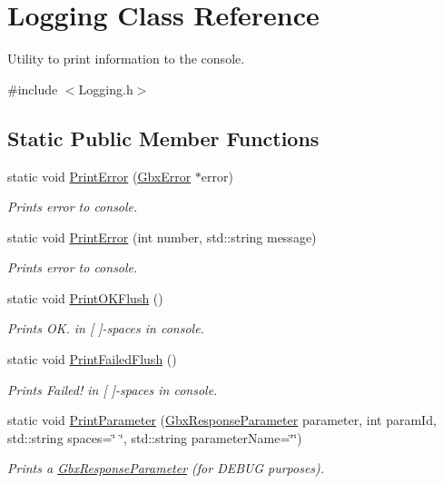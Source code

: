 \hypertarget{classLogging}{\section{Logging Class Reference}
\label{classLogging}
}


Utility to print information to the console.  




{\ttfamily \#include $<$Logging.\-h$>$}

\subsection*{Static Public Member Functions}
\begin{DoxyCompactItemize}
\item 
static void \hyperlink{classLogging_a171703bedcbf215f0e6334f29c8281b5}{Print\-Error} (\hyperlink{structGbxError}{Gbx\-Error} $\ast$error)
\begin{DoxyCompactList}\small\item\em Prints error to console. \end{DoxyCompactList}\item 
static void \hyperlink{classLogging_ac1397db1b8ea6625f7dd2616f530cd7d}{Print\-Error} (int number, std\-::string message)
\begin{DoxyCompactList}\small\item\em Prints error to console. \end{DoxyCompactList}\item 
\hypertarget{classLogging_a889f2ad8f991afdf0959cb1cad736fa7}{static void \hyperlink{classLogging_a889f2ad8f991afdf0959cb1cad736fa7}{Print\-O\-K\-Flush} ()}\label{classLogging_a889f2ad8f991afdf0959cb1cad736fa7}

\begin{DoxyCompactList}\small\item\em Prints O\-K. in \mbox{[} \mbox{]}-\/spaces in console. \end{DoxyCompactList}\item 
\hypertarget{classLogging_add0483bd14aef74ec988606cd7dbfc4b}{static void \hyperlink{classLogging_add0483bd14aef74ec988606cd7dbfc4b}{Print\-Failed\-Flush} ()}\label{classLogging_add0483bd14aef74ec988606cd7dbfc4b}

\begin{DoxyCompactList}\small\item\em Prints Failed! in \mbox{[} \mbox{]}-\/spaces in console. \end{DoxyCompactList}\item 
static void \hyperlink{classLogging_a1f8609052e40055fb9ef3ddd40d0620e}{Print\-Parameter} (\hyperlink{classGbxResponseParameter}{Gbx\-Response\-Parameter} parameter, int param\-Id, std\-::string spaces=\char`\"{}    \char`\"{}, std\-::string parameter\-Name=\char`\"{}\char`\"{})
\begin{DoxyCompactList}\small\item\em Prints a \hyperlink{classGbxResponseParameter}{Gbx\-Response\-Parameter} (for D\-E\-B\-U\-G purposes). \end{DoxyCompactList}\end{DoxyCompactItemize}



